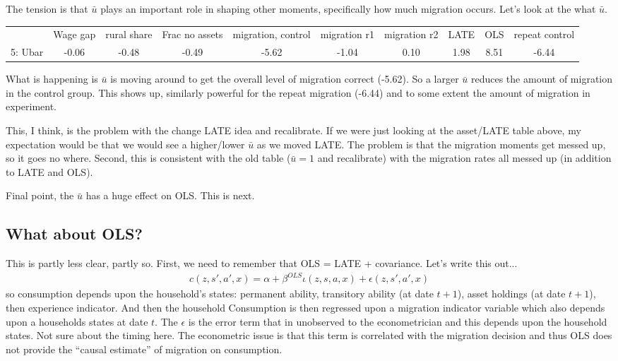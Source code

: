 \documentclass[pdftex,11pt]{article}
\renewcommand{\arraystretch}{.7}
\begin{document}
The tension is that $\bar u$ plays an important role in shaping other moments, specifically how much migration occurs. Let's look at the what $\bar u$.

\begin{table}[!h]
\footnotesize
\setlength {\tabcolsep}{1.5mm}
\renewcommand{\arraystretch}{2.25}
\begin{center}\label{tb:employment}
\begin{tabular}{l c c c c c c c c c }
\hline
\hline
& Wage gap & rural share &  Frac no assets & migration, control &  migration r1 & migration r2 & LATE & OLS & repeat control \\
5: Ubar &  -0.06 &   -0.48 &  -0.49  & -5.62  & -1.04  &  0.10  &  1.98  &  8.51  & -6.44 \\

\hline
\hline
\end{tabular}
\end{center}
\end{table}

What is happening is $\bar u$ is moving around to get the overall level of migration correct (-5.62). So a larger $\bar u$ reduces the amount of migration in the control group. This shows up, similarly powerful for the repeat migration (-6.44) and to some extent the amount of migration in experiment.

This, I think, is the problem with the change LATE idea and recalibrate. If we were just looking at the asset/LATE table above, my expectation would be that we would see a higher/lower $\bar u$ as we moved LATE. The problem is that the migration moments get messed up, so it goes no where. Second, this is consistent with the old table ($\bar u = 1$ and recalibrate) with the migration rates all messed up (in addition to LATE and OLS).

Final point, the $\bar u$ has a huge effect on OLS. This is next.

\subsection{What about OLS?}

This is partly less clear, partly so. First, we need to remember that OLS = LATE + covariance. Let's write this out...
\begin{align}
c(z,s',a',x) = \alpha + \beta^{OLS} \iota(z,s,a,x) + \epsilon(z,s',a',x)
\end{align}
so consumption depends upon the household's states: permanent ability, transitory ability (at date $t+1$), asset holdings (at date $t+1$), then experience indicator. And then the household Consumption is then regressed upon a migration indicator variable which also depends upon a households states at date $t$.  The $\epsilon$ is the error term that in unobserved to the econometrician and this depends upon the household states. Not sure about the timing here. The econometric issue is that this term is correlated with the migration decision and thus OLS does not provide the ``causal estimate'' of migration on consumption.
\end{document}
